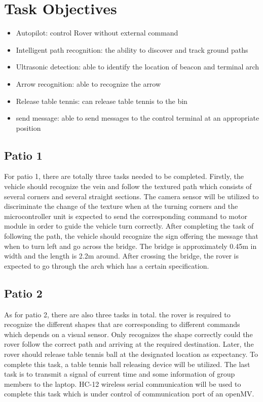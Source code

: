 \documentclass[12pt, a4paper, oneside]{report}
\begin{document}
\section{Task Objectives}
\begin{itemize}
    \item Autopilot: control Rover without external command
    \item Intelligent path recognition: the ability to discover and track ground paths
    \item Ultrasonic detection: able to identify the location of beacon and terminal arch
    \item Arrow recognition: able to recognize the arrow
    \item Release table tennis: can release table tennis to the bin
    \item send message: able to send messages to the control terminal at an appropriate position
\end{itemize}
    
\subsection{Patio 1}
For patio 1, there are totally three tasks needed to be completed. 
Firstly, the vehicle should recognize the vein and follow the textured path which consists of several corners and several straight sections. The camera sensor will be utilized to discriminate the change of the texture when at the turning corners and the microcontroller unit is expected to send the corresponding command to motor module in order to guide the vehicle turn correctly. 
After completing the task of following the path, the vehicle should recognize the sign offering the message that when to turn left and go across the bridge. The bridge is approximately 0.45m in width and the length is 2.2m around. 
After crossing the bridge, the rover is expected to go through the arch which has a certain specification. 

\subsection{Patio 2}
As for patio 2, there are also three tasks in total.
the rover is required to recognize the different shapes that are corresponding to different commands which depends on a visual sensor. Only recognizes the shape correctly could the rover follow the correct path and arriving at the required destination. 
Later, the rover should release table tennis ball at the designated location as expectancy. To complete this task, a table tennis ball releasing device will be utilized. 
The last task is to transmit a signal of current time and some information of group members to the laptop. HC-12 wireless serial communication will be used to complete this task which is under control of communication port of an openMV.
\end{document}

